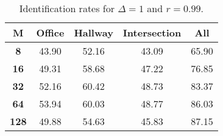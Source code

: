 \begin{table}[h]
    \footnotesize
    \centering
    \begin{tabular}{|c|c|c|c|l|}
    \hline
    {\bf M} & {\bf Office} & {\bf Hallway} & {\bf Intersection} &     \multicolumn{1}{c|}{{\bf All}} \\ \hline
    {\bf 8} & 43.90 & 52.16 & 43.09 & 65.90 \\ \hline
    {\bf 16} & 49.31 & 58.68 & 47.22 & 76.85 \\ \hline
    {\bf 32} & 52.16 & 60.42 & 48.73 & 83.37 \\ \hline
    {\bf 64} & 53.94 & 60.03 & 48.77 & 86.03 \\ \hline
    {\bf 128} & 49.88 & 54.63 & 45.83 & 87.15 \\ \hline
    \end{tabular}
    \caption{Identification rates for $\Delta = 1$ and $r = 0.99$.}
    \label{tab:identify_speakers_0.99_mit_19_1}
\end{table}
